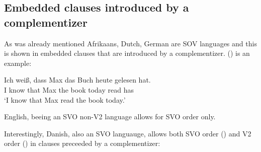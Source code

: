 \subsection{Embedded clauses introduced by a complementizer}

As was already mentioned Afrikaans, Dutch, German are SOV languages and this is shown in embedded
clauses that are introduced by a complementizer. () is an example:

\ea
\gll Ich weiß, dass Max das Buch heute gelesen hat.\\
     I know that Max the book today read has\\
\glt `I know that Max read the book today.'
\z



English, beeing an SVO non-V2 language allows for SVO order only.
\z

Interestingly, Danish, also an SVO languauge, allows both SVO order () and V2 order () in clauses
preceeded by a complementizer:
\z

